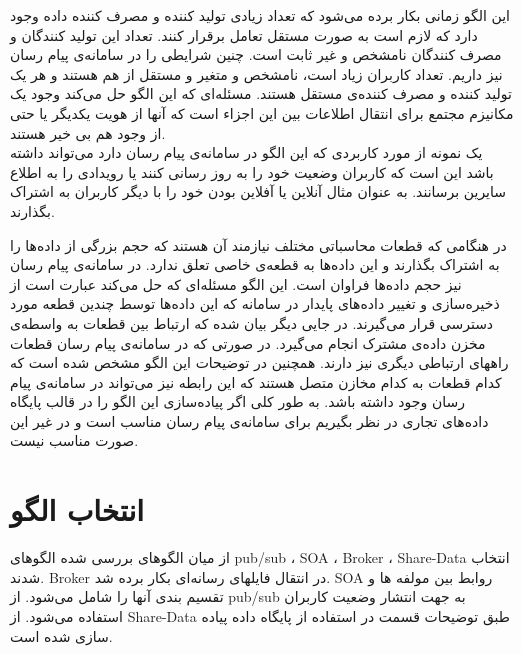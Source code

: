 این الگو زمانی بکار برده می‌شود که تعداد زیادی تولید کننده و مصرف کننده داده وجود دارد که لازم است به صورت مستقل تعامل برقرار کنند. تعداد این تولید کنندگان و مصرف کنندگان نامشخص و غیر ثابت است. چنین شرایطی را در سامانه‌ی پیام رسان نیز داریم. تعداد کاربران زیاد است، نامشخص و متغیر و مستقل از هم هستند و هر یک تولید کننده و مصرف کننده‌ی مستقل هستند. مسئله‌ای که این الگو حل می‌کند وجود یک مکانیزم مجتمع برای انتقال اطلاعات بین این اجزاء است که آنها از هویت یکدیگر یا حتی از وجود هم بی خیر هستند. \\
یک نمونه از مورد کاربردی که این الگو در سامانه‌ی پیام رسان دارد می‌تواند داشته باشد این است که کاربران وضعیت خود را به روز رسانی کنند یا رویدادی را به اطلاع سایرین برسانند. به عنوان مثال آنلاین یا آفلاین بودن خود را با دیگر کاربران به اشتراک بگذارند.

در هنگامی که قطعات   محاسباتی مختلف نیازمند آن هستند که حجم بزرگی از داده‌ها را به اشتراک بگذارند و این داده‌ها به قطعه‌ی خاصی تعلق ندارد. در سامانه‌ی پیام‌ رسان نیز حجم داده‌ها فراوان است. این الگو مسئله‌ای که حل می‌کند عبارت است از ذخیره‌سازی و تغییر داده‌های پایدار در سامانه که این داده‌ها توسط چندین قطعه مورد دسترسی قرار می‌گیرند. در جایی دیگر بیان شده که ارتباط بین قطعات به واسطه‌ی مخزن داده‌ی مشترک  انجام می‌گیرد. در صورتی که در سامانه‌ی پیام رسان قطعات راههای ارتباطی دیگری نیز دارند. همچنین در توضیحات این الگو مشخص شده است که کدام قطعات به کدام مخازن متصل هستند که این رابطه نیز می‌تواند در سامانه‌ی پیام رسان وجود داشته باشد. به طور کلی اگر پیاده‌سازی این الگو را در قالب پایگاه داده‌های تجاری در نظر بگیریم برای سامانه‌ی پیام رسان مناسب است و در غیر این صورت مناسب نیست.
\section{انتخاب الگو}
از میان الگوهای بررسی شده الگوهای pub/sub ، SOA ، ‌Broker ، Share-Data انتخاب شدند. ‌Broker ‌در انتقال فایلهای رسانه‌ای بکار برده شد. SOA روابط بین مولفه ها و تقسیم بندی آنها را شامل می‌شود.  از pub/sub به جهت انتشار وضعیت کاربران استفاده می‌شود. از Share-Data  طبق توضیحات قسمت  در استفاده از پایگاه داده پیاده سازی شده است.
















